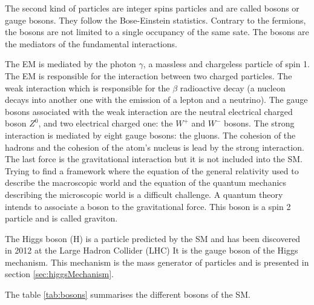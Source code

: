     The second kind of particles are integer spins particles and are called bosons or gauge bosons.
    They follow the Bose-Einstein statistics. 
    Contrary to the fermions, the bosons are not limited to a single occupancy of the same sate.
    The bosons are the mediators of the fundamental interactions.    

    The \gls{EM} is mediated by the photon $\gamma$, a massless and chargeless particle of spin 1.
    The \gls{EM} is responsible for the interaction between two charged particles.
    The weak interaction which is responsible for the $\beta$ radioactive decay (a nucleon decays into another one with the emission of a lepton and a neutrino).
    The gauge bosons associated with the weak interaction are the neutral electrical charged boson $Z^0$, and two electrical charged one: the $W^+$ and $W^-$ bosons.
    The strong interaction is mediated by eight gauge bosons: the gluons.
    The cohesion of the hadrons and the cohesion of the atom's nucleus is lead by the strong interaction.
    The last force is the gravitational interaction but it is not included into the \gls{SM}.
    Trying to find a framework where the equation of the general relativity used to describe the macroscopic world and the equation of the quantum mechanics describing the microscopic world is a difficult challenge.
    A quantum theory intends to associate a boson to the gravitational force. 
    This boson is a spin 2 particle and is called graviton.

    The Higgs boson (H) is a particle predicted by the \gls{SM} and has been discovered in 2012 at the Large Hadron Collider (LHC)
    It is the gauge boson of the Higgs mechanism.
    This mechanism is the mass generator of particles and is presented in section \ref{sec:higgsMechanism}.
    
    The table \ref{tab:bosons} summarises the different bosons of the \gls{SM}.

